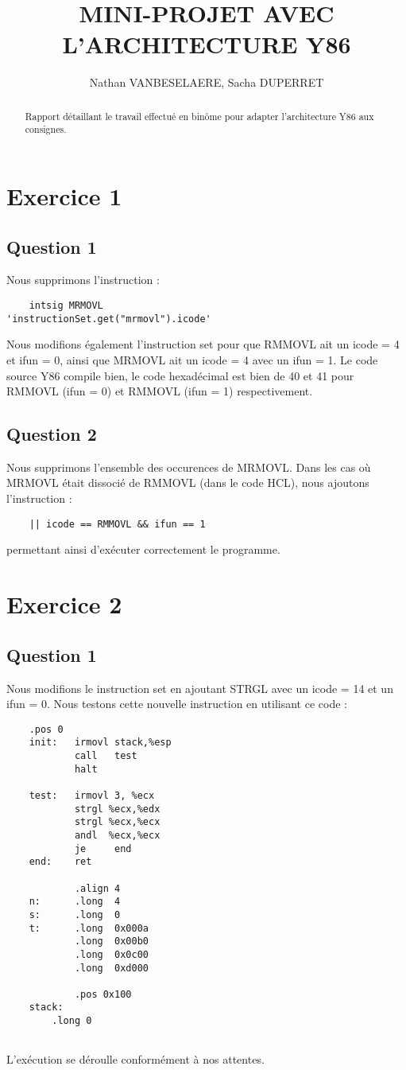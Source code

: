 \documentclass[a4paper,10pt]{article}
\title{MINI-PROJET AVEC L'ARCHITECTURE Y86}
\author{Nathan VANBESELAERE, Sacha DUPERRET}
\begin{document}
\maketitle

\begin{abstract}
Rapport détaillant le travail effectué en binôme pour adapter l'architecture Y86 aux consignes.
\end{abstract}

\tableofcontents

\section{Exercice 1}
\subsection{Question 1}

Nous supprimons l'instruction :
\begin{verbatim}
    intsig MRMOVL                   'instructionSet.get("mrmovl").icode'
\end{verbatim}
Nous modifions également l'instruction set pour que RMMOVL ait un icode = 4 et ifun = 0, ainsi que MRMOVL ait un icode = 4 avec un ifun = 1.
Le code source Y86 compile bien, le code hexadécimal est bien de 40 et 41 pour RMMOVL (ifun = 0) et RMMOVL (ifun = 1) respectivement.

\subsection{Question 2}
Nous supprimons l'ensemble des occurences de MRMOVL.
Dans les cas où MRMOVL était dissocié de RMMOVL (dans le code HCL), nous ajoutons l'instruction :
\begin{verbatim}
    || icode == RMMOVL && ifun == 1
\end{verbatim}
permettant ainsi d'exécuter correctement le programme.

\section{Exercice 2}
\subsection{Question 1}
Nous modifions le instruction set en ajoutant STRGL avec un icode = 14 et un ifun = 0.
Nous testons cette nouvelle instruction en utilisant ce code :
\begin{verbatim}
    .pos 0
    init:   irmovl stack,%esp
            call   test
            halt
    
    test:   irmovl 3, %ecx
            strgl %ecx,%edx
            strgl %ecx,%ecx
            andl  %ecx,%ecx
            je     end
    end:    ret
    
            .align 4
    n:      .long  4
    s:      .long  0
    t:      .long  0x000a
            .long  0x00b0
            .long  0x0c00
            .long  0xd000
    
            .pos 0x100
    stack:
        .long 0
    
\end{verbatim}
L'exécution se déroulle conformément à nos attentes.
\end{document}

